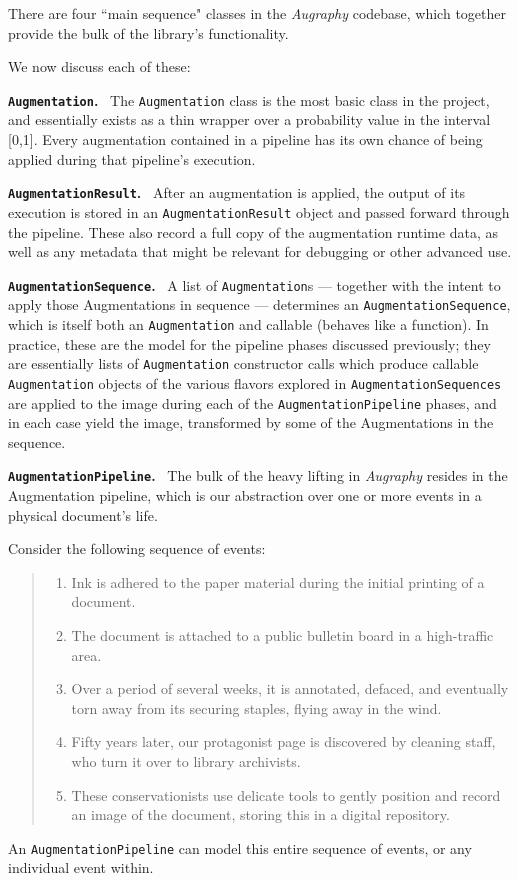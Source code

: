 \documentclass[runningheads]{llncs}
\begin{document}
There are four ``main sequence" classes in the \emph{Augraphy} codebase, which together provide the bulk of the library's functionality.

We now discuss each of these:

\smallskip
\noindent\textbf{\texttt{Augmentation}.} ~The \texttt{Augmentation} class is the most basic class in the project, and essentially exists as a thin wrapper over a probability value in the interval [0,1].
Every augmentation contained in a pipeline has its own chance of being applied during that pipeline's execution.

\smallskip
\noindent\textbf{\texttt{AugmentationResult}.} ~After an augmentation is applied, the output of its execution is stored in an \texttt{AugmentationResult} object and passed forward through the pipeline.
These also record a full copy of the augmentation runtime data, as well as any metadata that might be relevant for debugging or other advanced use.

\smallskip
\noindent\textbf{\texttt{AugmentationSequence}.} ~A list of \texttt{Augmentation}s --- together with the intent to apply those Augmentations in sequence --- determines an \texttt{AugmentationSequence}, which is itself both an \texttt{Augmentation} and callable (behaves like a function).
In practice, these are the model for the pipeline phases discussed previously; they are essentially lists of \texttt{Augmentation} constructor calls which produce callable \texttt{Augmentation} objects of the various flavors explored in \texttt{AugmentationSequences} are applied to the image during each of the \texttt{AugmentationPipeline} phases, and in each case yield the image, transformed by some of the Augmentations in the sequence.

\smallskip
\noindent\textbf{\texttt{AugmentationPipeline}.} ~The bulk of the heavy lifting in \emph{Augraphy} resides in the Augmentation pipeline, which is our abstraction over one or more events in a physical document's life.

Consider the following sequence of events:
\begin{quote}
  \begin{enumerate}
  \item Ink is adhered to the paper material during the initial printing of a document.
  \item The document is attached to a public bulletin board in a high-traffic area.
  \item Over a period of several weeks, it is annotated, defaced, and eventually torn away from its securing staples, flying away in the wind.
  \item Fifty years later, our protagonist page is discovered by cleaning staff, who turn it over to library archivists.
  \item These conservationists use delicate tools to gently position and record an image of the document, storing this in a digital repository.
  \end{enumerate}
\end{quote}
An \texttt{AugmentationPipeline} can model this entire sequence of events, or any individual event within.
\end{document}
